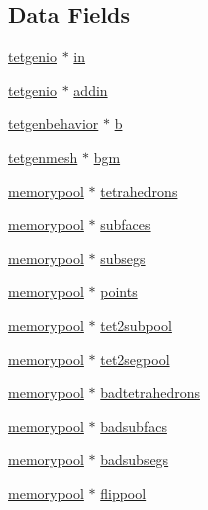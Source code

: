 \subsection*{Data Fields}
\begin{DoxyCompactItemize}
\item 
\hyperlink{classtetgenio}{tetgenio} $\ast$ \hyperlink{classtetgenmesh_ad1c82326f58ac7fa521a5fb8bb7ed337}{in}
\item 
\hyperlink{classtetgenio}{tetgenio} $\ast$ \hyperlink{classtetgenmesh_aa9397e3a7fcb518a2652c8621a7aba65}{addin}
\item 
\hyperlink{classtetgenbehavior}{tetgenbehavior} $\ast$ \hyperlink{classtetgenmesh_ae28df2638f22659903e727e2ffa05357}{b}
\item 
\hyperlink{classtetgenmesh}{tetgenmesh} $\ast$ \hyperlink{classtetgenmesh_a7e3caf366c729754f62b410a8fd16c6d}{bgm}
\item 
\hyperlink{classtetgenmesh_1_1memorypool}{memorypool} $\ast$ \hyperlink{classtetgenmesh_ae2ecb721778b73b3b10163e3069247a6}{tetrahedrons}
\item 
\hyperlink{classtetgenmesh_1_1memorypool}{memorypool} $\ast$ \hyperlink{classtetgenmesh_af637b87538d6c06fdbb47b24f940a18e}{subfaces}
\item 
\hyperlink{classtetgenmesh_1_1memorypool}{memorypool} $\ast$ \hyperlink{classtetgenmesh_a1a6e03af9ec55a3366aea8f7e39c67ed}{subsegs}
\item 
\hyperlink{classtetgenmesh_1_1memorypool}{memorypool} $\ast$ \hyperlink{classtetgenmesh_a419c24648d1c776238575e9f950b1124}{points}
\item 
\hyperlink{classtetgenmesh_1_1memorypool}{memorypool} $\ast$ \hyperlink{classtetgenmesh_a978aa6cc9c136c92ac09a6b56afc4eac}{tet2subpool}
\item 
\hyperlink{classtetgenmesh_1_1memorypool}{memorypool} $\ast$ \hyperlink{classtetgenmesh_a1a898456746189f3c656c22eaa6feb48}{tet2segpool}
\item 
\hyperlink{classtetgenmesh_1_1memorypool}{memorypool} $\ast$ \hyperlink{classtetgenmesh_a04983fc27254c1b6a1456862293f74bb}{badtetrahedrons}
\item 
\hyperlink{classtetgenmesh_1_1memorypool}{memorypool} $\ast$ \hyperlink{classtetgenmesh_a5e4083990698cca66aee54fc110dd288}{badsubfacs}
\item 
\hyperlink{classtetgenmesh_1_1memorypool}{memorypool} $\ast$ \hyperlink{classtetgenmesh_ac43e4dd0213f6b589fade06bf09a8d8c}{badsubsegs}
\item 
\hyperlink{classtetgenmesh_1_1memorypool}{memorypool} $\ast$ \hyperlink{classtetgenmesh_a96eb63bf97a4e4b9f9ad7148444bd530}{flippool}

\end{DoxyCompactItemize}
